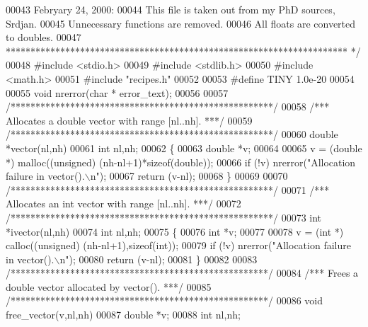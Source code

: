 \begin{DoxyCode}
00043 \textcolor{comment}{        Febryary 24, 2000:}
00044 \textcolor{comment}{            This file is taken out from my PhD sources, Srdjan.}
00045 \textcolor{comment}{            Unnecessary functions are removed.}
00046 \textcolor{comment}{            All floats are converted to doubles.}
00047 \textcolor{comment}{  ********************************************************************* */}
00048 \textcolor{preprocessor}{#include <stdio.h>}
00049 \textcolor{preprocessor}{#include <stdlib.h>}
00050 \textcolor{preprocessor}{#include <math.h>}
00051 \textcolor{preprocessor}{#include "recipes.h"}
00052 
00053 \textcolor{preprocessor}{#define TINY 1.0e-20}
00054 
00055 \textcolor{keywordtype}{void} nrerror(\textcolor{keywordtype}{char} * error\_text); 
00056 
00057 \textcolor{comment}{/*****************************************************/}
00058 \textcolor{comment}{/*** Allocates a double vector with range [nl..nh]. ***/}
00059 \textcolor{comment}{/*****************************************************/}
00060 \textcolor{keywordtype}{double}  *vector(nl,nh)
00061 int    nl,nh;
00062 \{
00063     \textcolor{keywordtype}{double} *v;
00064 
00065     v = (\textcolor{keywordtype}{double} *) malloc((\textcolor{keywordtype}{unsigned}) (nh-nl+1)*\textcolor{keyword}{sizeof}(\textcolor{keywordtype}{double}));
00066     \textcolor{keywordflow}{if} (!v) nrerror(\textcolor{stringliteral}{"Allocation failure in vector().\(\backslash\)n"});
00067     \textcolor{keywordflow}{return} (v-nl);
00068 \}
00069 
00070 \textcolor{comment}{/*****************************************************/}
00071 \textcolor{comment}{/*** Allocates an int vector with range [nl..nh].  ***/}
00072 \textcolor{comment}{/*****************************************************/}
00073 \textcolor{keywordtype}{int}  *ivector(nl,nh)
00074 int  nl,nh;
00075 \{
00076     \textcolor{keywordtype}{int} *v;
00077 
00078     v = (\textcolor{keywordtype}{int} *) calloc((\textcolor{keywordtype}{unsigned}) (nh-nl+1),\textcolor{keyword}{sizeof}(\textcolor{keywordtype}{int}));
00079     \textcolor{keywordflow}{if} (!v) nrerror(\textcolor{stringliteral}{"Allocation failure in vector().\(\backslash\)n"});
00080     \textcolor{keywordflow}{return} (v-nl);
00081 \}
00082 
00083 \textcolor{comment}{/****************************************************/}
00084 \textcolor{comment}{/*** Frees a double vector allocated by vector().  ***/}
00085 \textcolor{comment}{/****************************************************/}
00086 \textcolor{keywordtype}{void} free_vector(v,nl,nh)
00087 double *v;
00088 \textcolor{keywordtype}{int}   nl,nh;

\end{DoxyCode}
